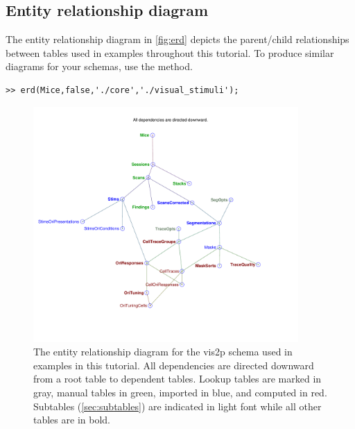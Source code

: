\documentclass[10pt]{article}
\begin{document}
\subsection{Entity relationship diagram}\label{sec:erd}
The entity relationship diagram in \autoref{fig:erd} depicts the parent/child relationships between tables used in examples throughout this tutorial. To produce similar diagrams for your schemas, use the  method.

\begin{lstlisting}
>> erd(Mice,false,'./core','./visual_stimuli');
\end{lstlisting}
\begin{figure}[h]
\center \includegraphics[width=0.9\textwidth]{erd.pdf}
\caption{The entity relationship diagram for the vis2p schema used in examples in this tutorial.  All dependencies are directed downward from a root table to dependent tables. Lookup tables are marked in gray, manual tables in green, imported in blue, and computed in red. Subtables (\autoref{sec:subtables}) are indicated in light font while all other tables are in bold.}
\label{fig:erd}
\end{figure}
\end{document}
